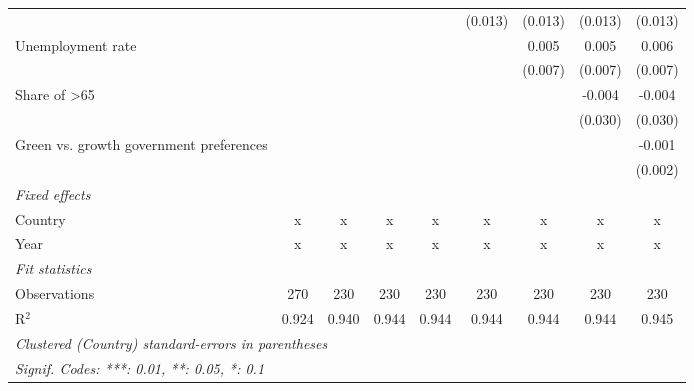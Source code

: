 \begin{table}[htbp]
\begin{tabular}{lcccccccc}
                                                             &         &         &               &               & (0.013)       & (0.013)       & (0.013)       & (0.013)\\   
      Unemployment rate                                      &         &         &               &               &               & 0.005         & 0.005         & 0.006\\   
                                                             &         &         &               &               &               & (0.007)       & (0.007)       & (0.007)\\   
      Share of >65                                           &         &         &               &               &               &               & -0.004        & -0.004\\   
                                                             &         &         &               &               &               &               & (0.030)       & (0.030)\\   
      Green vs. growth government preferences                &         &         &               &               &               &               &               & -0.001\\   
                                                             &         &         &               &               &               &               &               & (0.002)\\   
      \emph{Fixed effects}\\
      Country                                                & x       & x       & x             & x             & x             & x             & x             & x\\  
      Year                                                   & x       & x       & x             & x             & x             & x             & x             & x\\  
      \midrule \emph{Fit statistics}\\
      Observations                                           & 270     & 230     & 230           & 230           & 230           & 230           & 230           & 230\\  
      R$^2$                                                  & 0.924   & 0.940   & 0.944         & 0.944         & 0.944         & 0.944         & 0.944         & 0.945\\  
      \midrule
      \multicolumn{9}{l}{\emph{Clustered (Country) standard-errors in parentheses}}\\
      \multicolumn{9}{l}{\emph{Signif. Codes: ***: 0.01, **: 0.05, *: 0.1}}\\
   \end{tabular}
\end{table}



